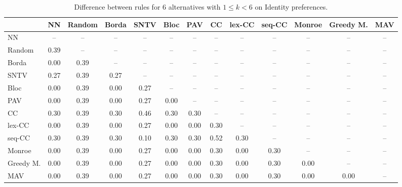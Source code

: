 
\begin{table*}[h!]
\centering
\begin{tabular}{lcccccccccccc}
\toprule
 & NN & Random & Borda & SNTV & Bloc & PAV & CC & lex-CC & seq-CC & Monroe & Greedy M. & MAV \\
\midrule
NN & -- & -- & -- & -- & -- & -- & -- & -- & -- & -- & -- & -- \\
Random & 0.39 & -- & -- & -- & -- & -- & -- & -- & -- & -- & -- & -- \\
Borda & 0.00 & 0.39 & -- & -- & -- & -- & -- & -- & -- & -- & -- & -- \\
SNTV & 0.27 & 0.39 & 0.27 & -- & -- & -- & -- & -- & -- & -- & -- & -- \\
Bloc & 0.00 & 0.39 & 0.00 & 0.27 & -- & -- & -- & -- & -- & -- & -- & -- \\
PAV & 0.00 & 0.39 & 0.00 & 0.27 & 0.00 & -- & -- & -- & -- & -- & -- & -- \\
CC & 0.30 & 0.39 & 0.30 & 0.46 & 0.30 & 0.30 & -- & -- & -- & -- & -- & -- \\
lex-CC & 0.00 & 0.39 & 0.00 & 0.27 & 0.00 & 0.00 & 0.30 & -- & -- & -- & -- & -- \\
seq-CC & 0.30 & 0.39 & 0.30 & 0.10 & 0.30 & 0.30 & 0.52 & 0.30 & -- & -- & -- & -- \\
Monroe & 0.00 & 0.39 & 0.00 & 0.27 & 0.00 & 0.00 & 0.30 & 0.00 & 0.30 & -- & -- & -- \\
Greedy M. & 0.00 & 0.39 & 0.00 & 0.27 & 0.00 & 0.00 & 0.30 & 0.00 & 0.30 & 0.00 & -- & -- \\
MAV & 0.00 & 0.39 & 0.00 & 0.27 & 0.00 & 0.00 & 0.30 & 0.00 & 0.30 & 0.00 & 0.00 & -- \\
\bottomrule
\end{tabular}

\caption{Difference between rules for 6 alternatives with $1 \leq k < 6$ on Identity preferences.}
\end{table*}
